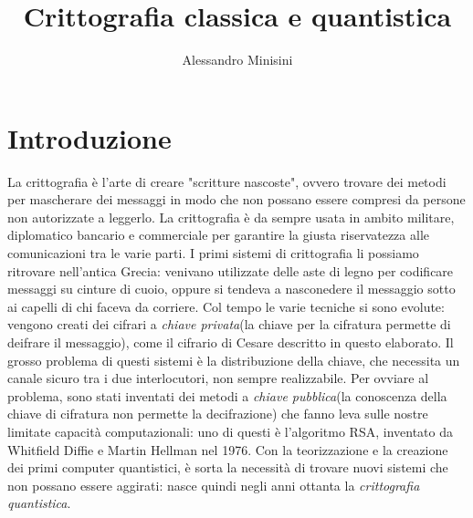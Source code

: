 \documentclass[italian,A4,12pt]{article}
\title{Crittografia classica e quantistica}
\author{Alessandro Minisini}
\affil{Liceo Scientifico Niccolò Copernico}
\date{}
\begin{document}
  \maketitle
  \newpage
  \tableofcontents
  \newpage
  \section{Introduzione}
  La crittografia è l'arte di creare "scritture nascoste", ovvero trovare dei metodi per mascherare dei messaggi in modo che non possano essere compresi da persone non autorizzate a leggerlo. La crittografia è da sempre usata in ambito militare, diplomatico bancario e commerciale per garantire la giusta riservatezza alle comunicazioni tra le varie parti. I primi sistemi di crittografia li possiamo ritrovare nell'antica Grecia: venivano utilizzate delle aste di legno per codificare messaggi su cinture di cuoio, oppure si tendeva a nasconedere il messaggio sotto ai capelli di chi faceva da corriere.
  Col tempo le varie tecniche si sono evolute: vengono creati dei cifrari a \textit{chiave privata}(la chiave per la cifratura permette di deifrare il messaggio), come il cifrario di Cesare descritto in questo elaborato.
  Il grosso problema di questi sistemi è la distribuzione della chiave, che necessita un canale sicuro tra i due interlocutori, non sempre realizzabile.
  Per ovviare al problema, sono stati inventati dei metodi a \textit{chiave pubblica}(la conoscenza della chiave di cifratura non permette la decifrazione) che fanno leva sulle nostre limitate capacità computazionali: uno di questi è l'algoritmo RSA, inventato da Whitfield Diffie e Martin Hellman nel 1976.
  Con la teorizzazione e la creazione dei primi computer quantistici, è sorta la necessità di trovare nuovi sistemi che non possano essere aggirati: nasce quindi negli anni ottanta la \textit{crittografia quantistica}.
\end{document}
